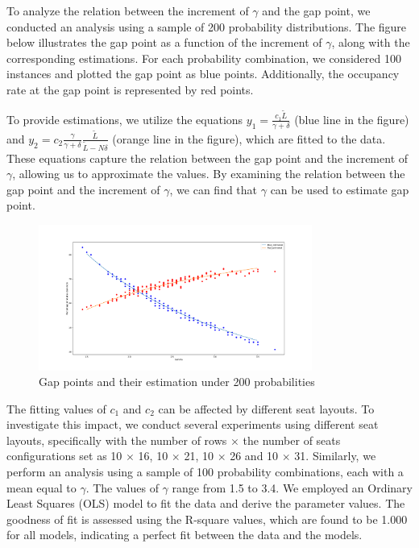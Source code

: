 To analyze the relation between the increment of $\gamma$ and the gap point, we conducted an analysis using a sample of 200 probability distributions. The figure below illustrates the gap point as a function of the increment of $\gamma$, along with the corresponding estimations. For each probability combination, we considered 100 instances and plotted the gap point as blue points. Additionally, the occupancy rate at the gap point is represented by red points.



To provide estimations, we utilize the equations $y_1 = \frac{c_1 \tilde{L}}{\gamma + \delta}$ (blue line in the figure) and $y_2 = c_2 \frac{\gamma}{\gamma + \delta} \frac{\tilde{L}}{\tilde{L}-N \delta}$ (orange line in the figure), which are fitted to the data. These equations capture the relation between the gap point and the increment of $\gamma$, allowing us to approximate the values. By examining the relation between the gap point and the increment of $\gamma$, we can find that $\gamma$ can be used to estimate gap point.

\begin{figure}[ht]
  \centering
    \includegraphics[width=0.8\textwidth]{./Figures/re2.pdf}
  \caption{Gap points and their estimation under 200 probabilities}
\end{figure}

The fitting values of $c_1$ and $c_2$ can be affected by different seat layouts. To investigate this impact, we conduct several experiments using different seat layouts, specifically with the number of rows $\times$ the number of seats configurations set as 10 $\times$ 16, 10 $\times$ 21, 10 $\times$ 26 and 10 $\times$ 31. Similarly, we perform an analysis using a sample of 100 probability combinations, each with a mean equal to $\gamma$. The values of $\gamma$ range from 1.5 to 3.4. We employed an Ordinary Least Squares (OLS) model to fit the data and derive the parameter values. The goodness of fit is assessed using the R-square values, which are found to be 1.000 for all models, indicating a perfect fit between the data and the models.

